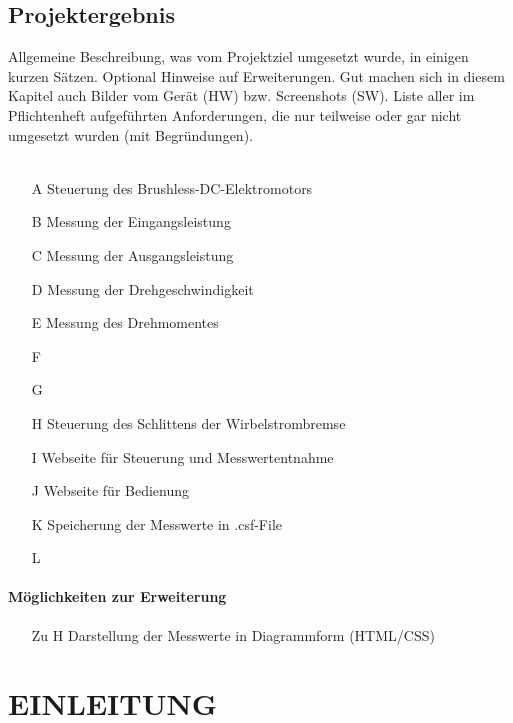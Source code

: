 \documentclass[12pt,a4paper]{article}
\newcommand{\yhbu}[0]{\color{ydkbu}}	%
\begin{document}
\subsection*{Projektergebnis}
{\yhbu
	Allgemeine Beschreibung, was vom Projektziel umgesetzt wurde, in einigen
	kurzen Sätzen. Optional Hinweise auf Erweiterungen. Gut machen sich in diesem
	Kapitel auch Bilder vom Gerät (HW) bzw. Screenshots (SW).
	Liste aller im Pflichtenheft aufgeführten Anforderungen, die nur teilweise oder gar
	nicht umgesetzt wurden (mit Begründungen).\\\\}
%	
\begin{itemize}
\item[A]Steuerung des Brushless-DC-Elektromotors
\item[B]Messung der Eingangsleistung
\item[C]Messung der Ausgangsleistung
\item[D]Messung der Drehgeschwindigkeit
\item[E]Messung des Drehmomentes
\item[F]
\item[G]
\item[H]Steuerung des Schlittens der Wirbelstrombremse
\item[I]Webseite für Steuerung und Messwertentnahme
\item[J]Webseite für Bedienung 
\item[K]Speicherung der Messwerte in .csf-File
\item[L]
\end{itemize}
%
\paragraph{Möglichkeiten zur Erweiterung}
\begin{itemize}
\item[Zu H]Darstellung der Messwerte in Diagrammform (HTML/CSS)
\end{itemize}
%
%
\newpage
\tableofcontents
%
\cfoot{\thesection-\rightmark}	%
\noindent%
\newpage
\setcounter{section}{0}
\section{EINLEITUNG}
%
\end{document}
